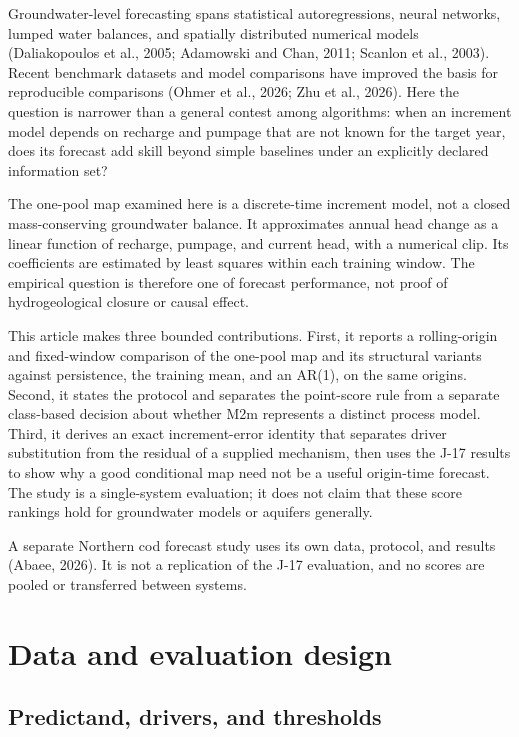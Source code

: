 \documentclass[11pt]{article}
\begin{document}
Groundwater-level forecasting spans statistical autoregressions, neural networks, lumped water balances, and spatially distributed numerical models (Daliakopoulos et al., 2005; Adamowski and Chan, 2011; Scanlon et al., 2003). Recent benchmark datasets and model comparisons have improved the basis for reproducible comparisons (Ohmer et al., 2026; Zhu et al., 2026). Here the question is narrower than a general contest among algorithms: when an increment model depends on recharge and pumpage that are not known for the target year, does its forecast add skill beyond simple baselines under an explicitly declared information set?

The one-pool map examined here is a discrete-time increment model, not a closed mass-conserving groundwater balance. It approximates annual head change as a linear function of recharge, pumpage, and current head, with a numerical clip. Its coefficients are estimated by least squares within each training window. The empirical question is therefore one of forecast performance, not proof of hydrogeological closure or causal effect.

This article makes three bounded contributions. First, it reports a rolling-origin and fixed-window comparison of the one-pool map and its structural variants against persistence, the training mean, and an AR(1), on the same origins. Second, it states the protocol and separates the point-score rule from a separate class-based decision about whether M2m represents a distinct process model. Third, it derives an exact increment-error identity that separates driver substitution from the residual of a supplied mechanism, then uses the J-17 results to show why a good conditional map need not be a useful origin-time forecast. The study is a single-system evaluation; it does not claim that these score rankings hold for groundwater models or aquifers generally.

A separate Northern cod forecast study uses its own data, protocol, and results (Abaee, 2026). It is not a replication of the J-17 evaluation, and no scores are pooled or transferred between systems.

\section{Data and evaluation design}

\subsection{Predictand, drivers, and thresholds}
\end{document}
